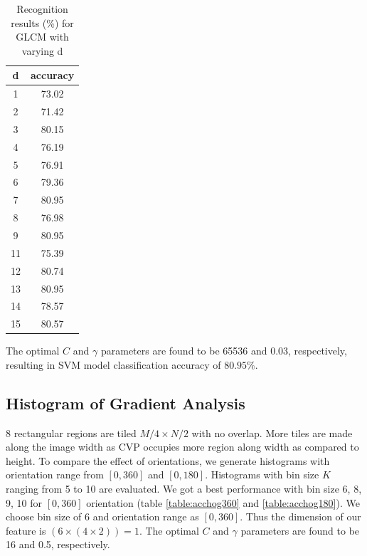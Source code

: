 \begin{table}[h] 
\begin{center}
	\caption{Recognition results (\%) for GLCM with varying d} 
    \begin{tabular}{| c | c |}
    \hline
    \textbf{d} & \textbf{accuracy} \\  \hline \hline
		 1 & 73.02 \\  \hline
		 2 & 71.42 \\  \hline
		 3 & 80.15 \\  \hline
		 4 & 76.19 \\  \hline
		 5 & 76.91 \\  \hline
		 6 & 79.36\\  \hline
		 7 & 80.95 \\  \hline
		 8 & 76.98 \\  \hline
		 9 & 80.95 \\  \hline
		 11 & 75.39\\  \hline
		 12 & 80.74 \\  \hline
		 13 & 80.95 \\  \hline
		 14 & 78.57 \\  \hline
		 15 & 80.57 \\  \hline
    \end{tabular}
		\label{table:accglcm} 
\end{center}
\end{table}


The optimal $C$ and $\gamma$ parameters are found to be 65536 and 0.03, respectively, resulting in SVM model classification accuracy of $80.95\%$.

\subsection{Histogram of Gradient Analysis}
8 rectangular regions are tiled $M/4 \times N/2$ with no overlap. More tiles are made along the image width as CVP occupies more region along width as compared to height. To compare the effect of orientations, we generate histograms with orientation range from $[0, 360]$ and $[0, 180]$. Histograms with bin size $K$ ranging from 5 to 10 are evaluated. We got a best performance with bin size 6, 8, 9, 10 for $[0, 360]$ orientation (table \ref{table:acchog360} and \ref{table:acchog180}). We choose bin size of 6 and orientation range as $[0, 360]$. Thus the dimension of our feature is $(6 \times (4 \times 2)) = 1$. The optimal $C$ and $\gamma$ parameters are found to be 16 and 0.5, respectively.

